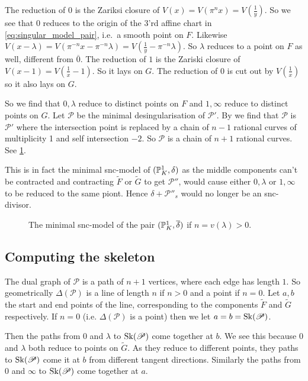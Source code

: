 The reduction of $0$ is the Zariksi closure of $V(x) = V(\pi ^{n} x ) = V(\frac{1}{y})$. 
So we see that $0$ reduces to the origin of the 3'rd affine chart in \eqref{eq:singular_model_pair}, i.e.\ a smooth point on $F$. 
Likewise  $V(x - \lambda) = V(\pi^{-n} x - \pi^{-n}\lambda) = V(\frac{1}{y} - \pi^{-n}\lambda)$. 
So $\lambda$ reduces to a point on $F$ as well, different from $\overline{0}$.
The reduction of $1$ is the Zariski closure of $V(x-1) = V(\frac{1}{x} - 1)$. 
So it lays on $G$. The reduction of $0$ is cut out by $V(\frac{1}{x})$ so it also lays on $G$. 

So we find that $0, \lambda$ reduce to distinct points on $F$ and $1, \infty$ reduce to distinct points on $G$. 
Let $\mathscr P$ be the minimal desingularisation of $\mathscr P'$. 
By \cite[cor.\ 9.3.25]{liuAlgebraicGeometryArithmetic2002} we find that $\mathscr P$ is $\mathscr P'$ where the intersection point is replaced by a chain of $n-1$ rational curves of multiplicity 1 and self intersection $-2$.  
So $\mathscr P$ is a chain of $n + 1$ rational curves. See \cref{fig:model_of_the_pair}. 

This is in fact the minimal snc-model of $(\mathbb{P}^{1}_K, \delta)$ as the middle components can't be contracted and contracting $\tilde F$ or $\tilde G$ to get $\mathscr P''$, would cause either $0, \lambda$ or $1, \infty$ to be reduced to the same piont. Hence $\delta + \mathscr P''_s$ would no longer be an snc-divisor. 
\begin{figure}[h]
    \centering
    \caption{The minimal snc-model of the pair $(\mathbb{P}^{1}_K, \overline{\delta})$ if $n =v(\lambda) > 0$. }
    \label{fig:model_of_the_pair}
\end{figure}

\subsection{Computing the skeleton} \label{sec:computing_the_skeleton}

The dual graph of $\mathscr P$ is a path of $n + 1$ vertices, where each edge has length $1$. 
So geometrically $\Delta(\mathscr P)$ is a line of length $n$ if $n > 0$ and a point if $n = 0$.
Let $a, b$ the start and end points of the line, corresponding to the components $\tilde F$ and $\tilde G$ respectively. If $n = 0$ (i.e. $\Delta(\mathscr P)$ is a point) then we let $a = b = \operatorname{Sk}(\mathscr P)$. 

Then the paths from $0$ and  $\lambda$ to $\operatorname{Sk}(\mathscr P)$ come together at $b$. We see this because $0$ and $\lambda$ both reduce to points on $\tilde G$. 
As they reduce to different points, they paths to $\operatorname{Sk}(\mathscr P)$ come it at $b$ from different tangent directions. 
Similarly the paths from $0$ and $\infty$ to $\operatorname{Sk}(\mathscr P)$ come together at $a$.

